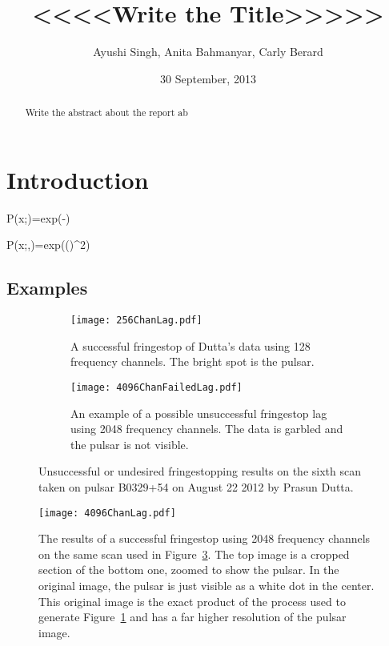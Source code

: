 \documentclass[a4paper,12pt]{article}
\begin{document}
\onehalfspacing
\title{<<<<Write the Title>>>>>}
\author{Ayushi Singh, Anita Bahmanyar, Carly Berard}
\date{30 September, 2013}
\maketitle

\begin{abstract}
Write the abstract about the report ab
\label{abstract}

\end{abstract}

\section{Introduction}
\label{sec:introduction}
P(x;\mu)=exp(-\mu)


P(x;\mu,\sigma)=exp(()^2)

\subsection{Examples}
\label{sec:ex}


\begin{figure}
\centering
\begin{subfigure}{0.5\textwidth}
  \centering
  \texttt{[image: 256ChanLag.pdf]}
  \caption{A successful fringestop of Dutta's data using 128 frequency channels. The bright spot is the pulsar.}
  \label{fig:sub1}
\end{subfigure}%
\begin{subfigure}{0.5\textwidth}
  \centering
  \texttt{[image: 4096ChanFailedLag.pdf]}
  \caption{An example of a possible unsuccessful fringestop lag using 2048 frequency channels. The data is garbled and the pulsar is not visible.}
  \label{fig:sub2}
\end{subfigure}
\caption{Unsuccessful or undesired fringestopping results on the sixth scan taken on pulsar B0329+54 on August 22 2012 by Prasun Dutta.}
\label{fig:failedFS}
\end{figure}

\begin{figure}
\centering
\texttt{[image: 4096ChanLag.pdf]}
\caption{The results of a successful fringestop using 2048 frequency channels on the same scan used in Figure~\ref{fig:failedFS}. The top image is a cropped section of the bottom one, zoomed to show the pulsar. In the original image, the pulsar is just visible as a white dot in the center. This original image is the exact product of the process used to generate Figure~\ref{fig:sub1} and has a far higher resolution of the pulsar image.}
\label{fig:successfulFS}
\end{figure}
\end{document}
